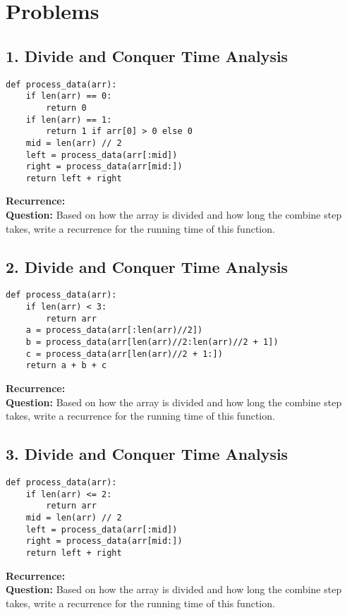\documentclass[12pt]{article}
\begin{document}
\section*{Problems}

\subsection*{1. Divide and Conquer Time Analysis}
\begin{lstlisting}
def process_data(arr):
    if len(arr) == 0:
        return 0
    if len(arr) == 1:
        return 1 if arr[0] > 0 else 0
    mid = len(arr) // 2
    left = process_data(arr[:mid])
    right = process_data(arr[mid:])
    return left + right
\end{lstlisting}
\textbf{Recurrence:} \underline{\hspace{10cm}} \\
\textbf{Question:} Based on how the array is divided and how long the combine step takes, write a recurrence for the running time of this function.

\vspace{2em}

\subsection*{2. Divide and Conquer Time Analysis}
\begin{lstlisting}
def process_data(arr):
    if len(arr) < 3:
        return arr
    a = process_data(arr[:len(arr)//2])
    b = process_data(arr[len(arr)//2:len(arr)//2 + 1])
    c = process_data(arr[len(arr)//2 + 1:])
    return a + b + c
\end{lstlisting}
\textbf{Recurrence:} \underline{\hspace{10cm}} \\
\textbf{Question:} Based on how the array is divided and how long the combine step takes, write a recurrence for the running time of this function.

\vspace{2em}

\subsection*{3. Divide and Conquer Time Analysis}
\begin{lstlisting}
def process_data(arr):
    if len(arr) <= 2:
        return arr
    mid = len(arr) // 2
    left = process_data(arr[:mid])
    right = process_data(arr[mid:])
    return left + right
\end{lstlisting}
\textbf{Recurrence:} \underline{\hspace{10cm}} \\
\textbf{Question:} Based on how the array is divided and how long the combine step takes, write a recurrence for the running time of this function.
\end{document}

